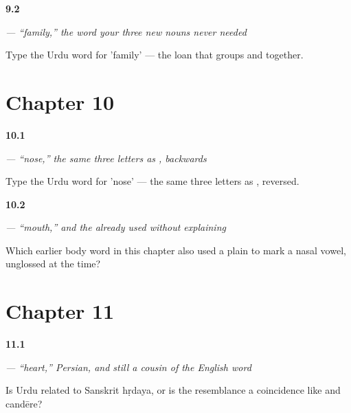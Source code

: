 \noindent\begin{minipage}[t]{\linewidth}
\raggedright
\hypertarget{review-UR-C09-khandan-sort}{\textbf{9.2}} \emph{ — \textquotedblleft{}family,\textquotedblright{} the word your three new nouns never needed}\par
\small Type the Urdu word for 'family' — the loan that groups  and  together.
\end{minipage}\par\medskip

\section*{Chapter 10}

\noindent\begin{minipage}[t]{\linewidth}
\raggedright
\hypertarget{review-UR-C10-naak-reversal}{\textbf{10.1}} \emph{ — \textquotedblleft{}nose,\textquotedblright{} the same three letters as , backwards}\par
\small Type the Urdu word for 'nose' — the same three letters as , reversed.
\end{minipage}\par\medskip

\noindent\begin{minipage}[t]{\linewidth}
\raggedright
\hypertarget{review-UR-C10-munh-nun}{\textbf{10.2}} \emph{ — \textquotedblleft{}mouth,\textquotedblright{} and the   already used without explaining}\par
\small Which earlier body word in this chapter also used a plain  to mark a nasal vowel, unglossed at the time?
\end{minipage}\par\medskip

\section*{Chapter 11}

\noindent\begin{minipage}[t]{\linewidth}
\raggedright
\hypertarget{review-UR-C11-dil-cousin}{\textbf{11.1}} \emph{ — \textquotedblleft{}heart,\textquotedblright{} Persian, and still a cousin of the English word}\par
\small Is Urdu  related to Sanskrit hṛdaya, or is the resemblance a coincidence like  and candēre?
\end{minipage}\par\medskip


